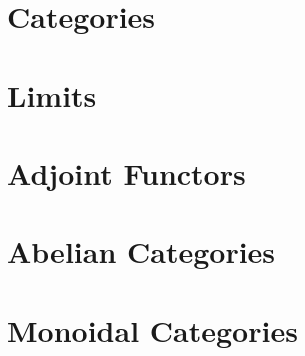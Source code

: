 \documentclass[../../deep-dive]{subfiles}
\begin{document}
\chapter{Categories}





\chapter{Limits}



\chapter{Adjoint Functors}



\chapter{Abelian Categories}



\chapter{Monoidal Categories}


\end{document}
